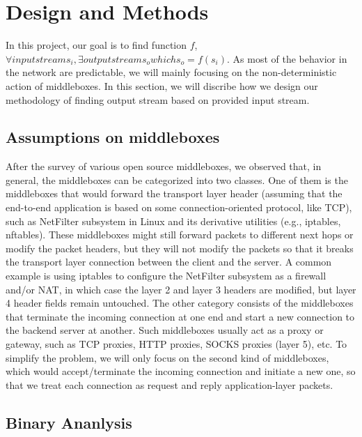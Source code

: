 \section{Design and Methods}

In this project, our goal is to find function \(f\), \(\forall input stream s_i, \exists output stream s_o which s_o = f(s_i)\).
As most of the behavior in the network are predictable, we will mainly focusing on the non-deterministic action of middleboxes.
In this section, we will discribe how we design our methodology of finding output stream based on provided input stream.

\subsection{Assumptions on middleboxes}

After the survey of various open source middleboxes, we observed that, in
general, the middleboxes can be categorized into two classes. One of them is the
middleboxes that would forward the transport layer header (assuming that the
end-to-end application is based on some connection-oriented protocol, like TCP),
such as NetFilter subsystem in Linux and its derivative utilities (e.g.,
iptables, nftables). These middleboxes might still forward packets to different
next hops or modify the packet headers, but they will not modify the packets so
that it breaks the transport layer connection between the client and the server.
A common example is using iptables to configure the NetFilter subsystem as a
firewall and/or NAT, in which case the layer 2 and layer 3 headers are modified,
but layer 4 header fields remain untouched. The other category consists of the
middleboxes that terminate the incoming connection at one end and start a new
connection to the backend server at another. Such middleboxes usually act as a
proxy or gateway, such as TCP proxies, HTTP proxies, SOCKS proxies (layer 5),
etc. To simplify the problem, we will only focus on the second kind of
middleboxes, which would accept/terminate the incoming connection and initiate a
new one, so that we treat each connection as request and reply application-layer
packets.

\subsection{Binary Ananlysis}

